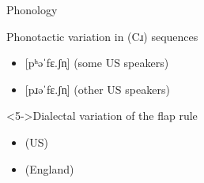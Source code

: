 \documentclass{beamer}
\newcommand{\subonethree}{Phonology}
\begin{document}
\begin{frame}[t]{\subonethree}
{\begin{block}{Phonotactic variation in (Cɹ) sequences}
            \begin{itemize}
              \item {[}pʰəˈfɛ.ʃn̩] (some US speakers)
              \item {[}pɹəˈfɛ.ʃn̩] (other US speakers)
            \end{itemize}
          \end{block}
          \begin{block}<5->{Dialectal variation of the flap rule}
            \begin{itemize}
              \item {} (US)
              \item {} (England)
            \end{itemize}
          \end{block}
        }
      \end{frame}
\end{document}
